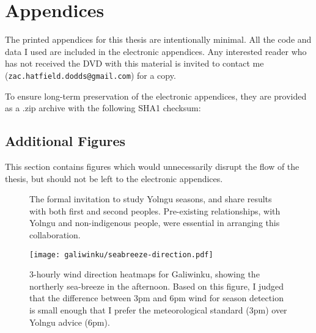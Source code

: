 \chapter{Appendices}
\label{ch:appendices}

The printed appendices for this thesis are intentionally minimal.
All the code and data I used are included in the electronic appendices.
Any interested reader who has not received the DVD with this material is
invited to contact me (\texttt{zac.hatfield.dodds@gmail.com}) for a copy.

To ensure long-term preservation of the electronic appendices, they
are provided as a .zip archive with the following SHA1 checksum:




\section*{Additional Figures}
This section contains figures which would unnecessarily disrupt the
flow of the thesis, but should not be left to the electronic appendices.


\begin{figure}[p]
    \centering
    \caption[Letter of invitation for collaborative research]{
        The formal invitation to study Yolngu seasons,
        and share results with both first and second peoples.
        Pre-existing relationships, with Yolngu and non-indigenous people,
        were essential in arranging this collaboration.
        }
    \label{app:invitation-letter}
\end{figure}

\begin{figure}[p]
    \centering
    \texttt{[image: galiwinku/seabreeze-direction.pdf]}
    \caption[3-hourly wind direction heatmaps, Galiwinku]{
        3-hourly wind direction heatmaps for Galiwinku,
        showing the northerly sea-breeze in the afternoon.
        Based on this figure, I judged that the difference between
        3pm and 6pm wind for season detection is small enough that
        I prefer the meteorological standard (3pm) over Yolngu advice (6pm).}
    \label{fig:galiwinku-seabreeze-direction}
\end{figure}
